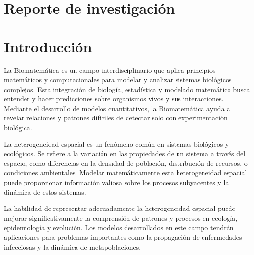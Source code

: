 \documentclass[fleqn,10pt]{SelfArx_063318} %
\affiliation{\textsuperscript{1}\textit{Centro de Neurociencias de Cuba, La Habana, Cuba, luisernesto.ibarra@cneuro.edu.cu, luise98cu@gmail.com}} %
\begin{document}
\flushbottom %

\maketitle %


\thispagestyle{empty} %


\section*{Reporte de investigación} %
\section{Introducción}

La Biomatemática es un campo interdisciplinario que aplica principios matemáticos y computacionales para modelar y
analizar sistemas biológicos complejos. Esta integración de biología, estadística y modelado matemático busca
entender y hacer predicciones sobre organismos vivos y sus interacciones. Mediante el desarrollo de modelos
cuantitativos, la Biomatemática ayuda a revelar relaciones y patrones difíciles de detectar solo con experimentación
biológica.

La heterogeneidad espacial es un fenómeno común en sistemas biológicos y ecológicos. Se refiere a la variación en las
propiedades de un sistema a través del espacio, como diferencias en la densidad de población, distribución de recursos,
o condiciones ambientales. Modelar matemáticamente esta heterogeneidad espacial puede proporcionar información valiosa
sobre los procesos subyacentes y la dinámica de estos sistemas.

La habilidad de representar adecuadamente la heterogeneidad espacial puede mejorar significativamente la
comprensión de patrones y procesos en ecología, epidemiología y evolución. Los modelos desarrollados en este campo
tendrán aplicaciones para problemas importantes como la propagación de enfermedades infecciosas y la dinámica de
metapoblaciones.
\end{document}
